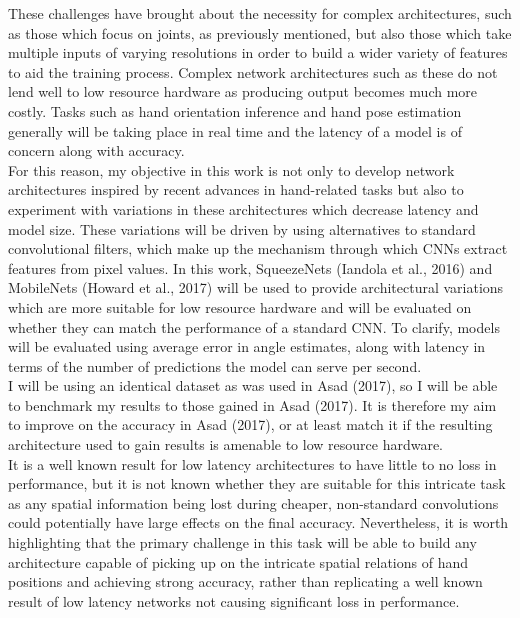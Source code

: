 \documentclass{article}
\begin{document}
These challenges have brought about the necessity for complex architectures, such as those which focus on joints, as previously mentioned, but also those which take multiple inputs of varying resolutions in order to build a wider variety of features to aid the training process. Complex network architectures such as these do not lend well to low resource hardware as producing output becomes much more costly. Tasks such as hand orientation inference and hand pose estimation generally will be taking place in real time and the latency of a model is of concern along with accuracy. \\

For this reason, my objective in this work is not only to develop network architectures inspired by recent advances in hand-related tasks but also to experiment with variations in these architectures which decrease latency and model size. These variations will be driven by using alternatives to standard convolutional filters, which make up the mechanism through which CNNs extract features from pixel values. In this work, SqueezeNets (Iandola et al., 2016) and MobileNets (Howard et al., 2017) will be used to provide architectural variations which are more suitable for low resource hardware and will be evaluated on whether they can match the performance of a standard CNN. To clarify, models will be evaluated using average error in angle estimates, along with latency in terms of the number of predictions the model can serve per second.\\

I will be using an identical dataset as was used in Asad (2017), so I will be able to benchmark my results to those gained in Asad (2017). It is therefore my aim to improve on the accuracy in Asad (2017), or at least match it if the resulting architecture used to gain results is amenable to low resource hardware. \\

It is a well known result for low latency architectures to have little to no loss in performance, but it is not known whether they are suitable for this intricate task as any spatial information being lost during cheaper, non-standard convolutions could potentially have large effects on the final accuracy. Nevertheless, it is worth highlighting that the primary challenge in this task will be able to build any architecture capable of picking up on the intricate spatial relations of hand positions and achieving strong accuracy, rather than replicating a well known result of low latency networks not causing significant loss in performance. \\
\end{document}
